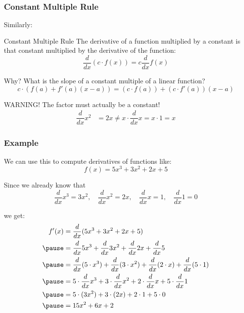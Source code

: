 \documentclass{ltx-talk}
\begin{document}
\begin{frame}
  \frametitle{Constant Multiple Rule}

  Similarly: 
  \begin{block}{Constant Multiple Rule}
    The derivative of a function multiplied by a constant
    is that constant multiplied by the derivative of the function: \pause
    \begin{equation}
      \dfrac{d}{dx}(c \cdot f(x)) = c \dfrac{d}{dx} f(x)
    \end{equation} \pause
  \end{block}

  Why? \pause What is the slope of a constant multiple of a linear function? \pause
  \begin{equation}
    c \cdot (f(a) + f'(a) (x - a)) =  (c \cdot f(a)) + (c \cdot f'(a))(x - a)
  \end{equation} \pause

  \begin{alertblock}{WARNING!}
    The factor must actually be a constant!
    \begin{align}
      \dfrac{d}{dx} x^2 &= 2x 
                        \neq x \cdot \dfrac{d}{dx} x = x \cdot 1 = x
    \end{align}
  \end{alertblock}
\end{frame}

\begin{frame}
  \frametitle{Example}
  We can use this to compute derivatives of functions like:
  \begin{equation}
    f(x) = 5x^3 + 3x^2 + 2x + 5
  \end{equation} \pause

  Since we already know that
  \begin{equation}
    \dfrac{d}{dx} x^3 = 3x^2, \quad \dfrac{d}{dx} x^2 = 2x, \quad \dfrac{d}{dx} x = 1, \quad \dfrac{d}{dx} 1 = 0
  \end{equation} \pause

  we get: \pause
  \begin{align}
    f'(x) &= \dfrac{d}{dx}(5x^3 + 3x^2 + 2x + 5) \\ \pause
          &= \dfrac{d}{dx} 5x^3 + \dfrac{d}{dx} 3x^2 + \dfrac{d}{dx} 2x + \dfrac{d}{dx} 5 \\ \pause
          &= \dfrac{d}{dx} (5 \cdot x^3) + \dfrac{d}{dx}(3 \cdot x^2) + \dfrac{d}{dx} (2 \cdot x) + \dfrac{d}{dx}(5 \cdot 1) \\ \pause
          &= 5 \cdot \dfrac{d}{dx} x^3 + 3 \cdot \dfrac{d}{dx} x^2 + 2 \cdot \dfrac{d}{dx} x + 5 \cdot \dfrac{d}{dx} 1 \\ \pause
          &= 5 \cdot (3x^2) + 3 \cdot (2x) + 2 \cdot 1 + 5 \cdot 0 \\ \pause
          &= 15x^2 + 6x + 2
  \end{align}
\end{frame}
\end{document}
